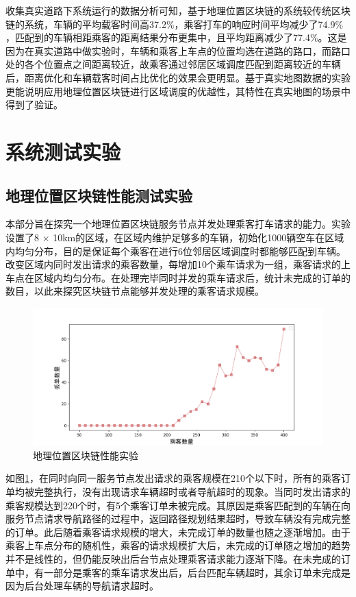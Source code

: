 收集真实道路下系统运行的数据分析可知，基于地理位置区块链的系统较传统区块链的系统，车辆的平均载客时间高37.2$\%$，乘客打车的响应时间平均减少了74.9$\%$，匹配到的车辆相距乘客的距离结果分布更集中，且平均距离减少了77.4$\%$。这是因为在真实道路中做实验时，车辆和乘客上车点的位置均选在道路的路口，而路口处的各个位置点之间距离较近，故乘客通过邻居区域调度匹配到距离较近的车辆后，距离优化和车辆载客时间占比优化的效果会更明显。基于真实地图数据的实验更能说明应用地理位置区块链进行区域调度的优越性，其特性在真实地图的场景中得到了验证。

\section{系统测试实验}
\subsection{地理位置区块链性能测试实验}
本部分旨在探究一个地理位置区块链服务节点并发处理乘客打车请求的能力。实验设置了8 × 10km的区域，在区域内维护足够多的车辆，初始化1000辆空车在区域内均匀分布，目的是保证每个乘客在进行6位邻居区域调度时都能够匹配到车辆。改变区域内同时发出请求的乘客数量，每增加10个乘车请求为一组，乘客请求的上车点在区域内均匀分布。在处理完毕同时并发的乘车请求后，统计未完成的订单的数目，以此来探究区块链节点能够并发处理的乘客请求规模。

\begin{figure}[h]
  \centering
  \includegraphics[width=1.0\textwidth]{figures/地理位置区块链性能实验}
  \caption{地理位置区块链性能实验}\label{fig:treeBlockchcainPerformance}
\end{figure}

如图\ref{fig:treeBlockchcainPerformance}，在同时向同一服务节点发出请求的乘客规模在210个以下时，所有的乘客订单均被完整执行，没有出现请求车辆超时或者导航超时的现象。当同时发出请求的乘客规模达到220个时，有5个乘客订单未被完成。其原因是乘客匹配到的车辆在向服务节点请求导航路径的过程中，返回路径规划结果超时，导致车辆没有完成完整的订单。此后随着乘客请求规模的增大，未完成订单的数量也随之逐渐增加。由于乘客上车点分布的随机性，乘客的请求规模扩大后，未完成的订单随之增加的趋势并不是线性的，但仍能反映出后台节点处理乘客请求能力逐渐下降。在未完成的订单中，有一部分是乘客的乘车请求发出后，后台匹配车辆超时，其余订单未完成是因为后台处理车辆的导航请求超时。

